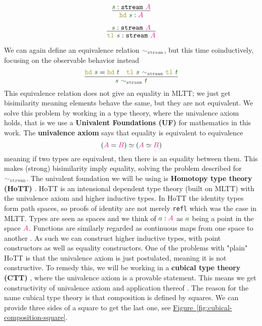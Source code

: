 \documentclass[twoside,11pt,openright]{report}
\theoremstyle{plain} %
\theoremstyle{definition}
\theoremstyle{remark}
\newcommand*{\figref}[1]{\hyperref[fig:#1]{Figure~\ref*{fig:#1}}}
\newcommand*{\term}[1]{\textcolor{green!30!black}{#1}} %
\newcommand*{\type}[1]{\textcolor{magenta!90!black}{#1}}
\newcommand*{\relation}[1]{\textcolor{gray!75!black}{\ensuremath{\mathtt{#1}}}}
\newcommand*{\destructor}[1]{\textcolor{yellow!60!black}{\ensuremath{\mathtt{#1}}}}
\newcommand*{\typeformer}[1]{\ensuremath{\mathtt{#1}}}
\begin{document}
\begin{center}
  \strut
  \hfill
  \begin{minipage}{0.225\linewidth}
    \begin{equation}
      \vcenter{\infer{\destructor{hd}~\term{s} : \type{A}}{\term{s} : \typeformer{stream}~\type{A}}}
    \end{equation}
  \end{minipage}
  \hfill
  \begin{minipage}{0.25\linewidth}
    \begin{equation}
      \vcenter{\infer{\destructor{tl}~\term{s}: \typeformer{stream}~\type{A}}{\term{s} : \typeformer{stream}~\type{A}}}
    \end{equation}
  \end{minipage}
  \hfill
  \strut
\end{center}
We can again define an equivalence relation \(\relation{\sim_{stream}}\), but this time coinductively, focusing on the observable behavior instead
\begin{equation}
  \label{eq:stream-bisimilarity}
  \vcenter{\infer{\term{s}~\relation{\sim_{stream}}~\term{t}}{\destructor{hd}~\term{s} = \destructor{hd}~\term{t} & \destructor{tl}~\term{s}~\relation{\sim_{stream}}~\destructor{tl}~\term{t}}}
\end{equation}
This equivalence relation does not give an equality in MLTT; we just get bisimilarity meaning elements behave the same, but they are not equivalent. We solve this problem by working in a type theory, where the univalence axiom holds, that is we use a \textbf{Univalent Foundations (UF)} for mathematics in this work. The \textbf{univalence axiom} says that equality is equivalent to equivalence
\begin{equation}
  (\type{A} = \type{B}) \simeq (\type{A} \simeq \type{B})
\end{equation}
meaning if two types are equivalent, then there is an equality between them. This makes (strong) bisimilarity imply equality, solving the problem described for \(\relation{\sim_{stream}}\). The univalent foundation we will be using is \textbf{Homotopy type theory (HoTT)} \cite{hottbook}. HoTT is an intensional dependent type theory (built on MLTT) with the univalence axiom and higher inductive types. In HoTT the identity types form path spaces, so proofs of identity are not merely \texttt{refl} which was the case in MLTT. Types are seen as spaces and we think of \(\term{a} : \type{A}\) as \(\term{a}\) being a point in the space \(\type{A}\). Functions are similarly regarded as continuous maps from one space to another \cite{nlab:homotopy_type_theory}. As such we can construct higher inductive types, with point constructors as well as equality constructors. One of the problems with "plain" HoTT is that the univalence axiom is just postulated, meaning it is not constructive. To remedy this, we will be working in a \textbf{cubical type theory (CTT)} \cite{DBLP:CTT}, where the univalence axiom is a provable statement. This means we get constructivity of univalence axiom and application thereof \cite{nlab:cubical_type_theory}.  The reason for the name cubical type theory is that composition is defined by squares. We can provide three sides of a square to get the last one, see \figref{cubical-composition-square}.
\end{document}

